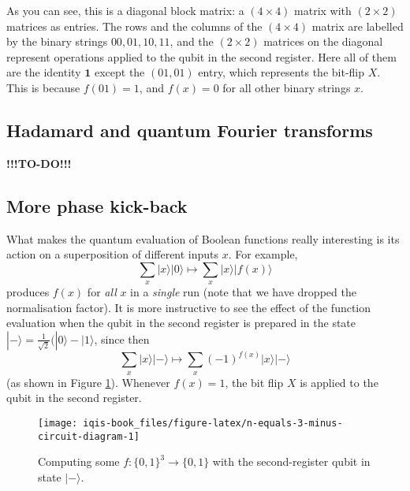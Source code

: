 \documentclass[fleqn]{article}
\begin{document}
As you can see, this is a diagonal block matrix: a \((4\times 4)\) matrix with \((2\times 2)\) matrices as entries.
The rows and the columns of the \((4\times 4)\) matrix are labelled by the binary strings \(00, 01, 10, 11\), and the \((2\times 2)\) matrices on the diagonal represent operations applied to the qubit in the second register.
Here all of them are the identity \(\mathbf{1}\) except the \((01, 01)\) entry, which represents the bit-flip \(X\).
This is because \(f(01)=1\), and \(f(x)=0\) for all other binary strings \(x\).

\hypertarget{hadamard-and-quantum-fourier-transforms}{%
\subsection{Hadamard and quantum Fourier transforms}\label{hadamard-and-quantum-fourier-transforms}}

\textbf{!!!TO-DO!!!}

\hypertarget{more-phase-kick-back}{%
\subsection{More phase kick-back}\label{more-phase-kick-back}}

What makes the quantum evaluation of Boolean functions really interesting is its action on a superposition of different inputs \(x\).
For example,
\[
  \sum_{x}|x\rangle|0\rangle
  \longmapsto
  \sum_{x}|x\rangle|f(x)\rangle
\]
produces \(f(x)\) for \emph{all} \(x\) in a \emph{single} run (note that we have dropped the normalisation factor).
It is more instructive to see the effect of the function evaluation when the qubit in the second register is prepared in the state \(|-\rangle = \frac{1}{\sqrt 2}(|0\rangle - |1\rangle\), since then
\[
  \sum_x|x\rangle|-\rangle
  \longmapsto
  \sum_x (-1)^{f(x)}|x\rangle|-\rangle
\]
(as shown in Figure \ref{fig:n-equals-3-minus-circuit-diagram}).
Whenever \(f(x)=1\), the bit flip \(X\) is applied to the qubit in the second register.



\begin{figure}[H]

{\centering \texttt{[image: iqis-book\_files/figure-latex/n-equals-3-minus-circuit-diagram-1]} 

}

\caption{Computing some \(f\colon\{0,1\}^3\to\{0,1\}\) with the second-register qubit in state \(|-\rangle\).}\label{fig:n-equals-3-minus-circuit-diagram}
\end{figure}
\end{document}

